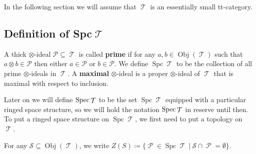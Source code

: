 \documentclass[11pt]{article}
\DeclareMathOperator{\ob}{Obj}
\DeclareMathOperator{\TT}{\mathcal{T}}
\DeclareMathOperator{\cP}{\mathcal{P}}
\DeclareMathOperator{\spc}{Spc}
\begin{document}
In the following section we will assume that $\TT$ is an essentially small tt-category.

\subsection{Definition of Spc\texorpdfstring{$\TT$}{𝓣}}

\begin{defn}
A thick $\otimes$-ideal $\mathcal{P} \subseteq \TT$ is called \textbf{prime} if for any $a,b \in \ob(\TT)$ such that $a \otimes b \in \mathcal{P}$ then either $a \in \mathcal{P}$ or $b \in \mathcal{P}$. We define $\spc \TT$ to be the collection of all prime $\otimes$-ideals in $\TT$. A \textbf{maximal} $\otimes$-ideal is a proper $\otimes$-ideal of $\TT$ that is maximal with respect to inclusion.
\end{defn}

Later on we will define $\Spec \TT $ to be the set $\spc \TT$ equipped with a particular ringed space structure, so we will hold the notation $\Spec \TT$ in reserve until then. To put a ringed space structure on $\spc \TT$, we first need to put a topology on $\TT$.

\begin{defn}
For any $\mathcal{S} \subseteq \ob(\TT)$, we write $Z(S) \coloneqq \{\cP \in \spc \TT\:|\:\mathcal{S}\cap \cP = \emptyset\}$.
\end{defn}
\end{document}
